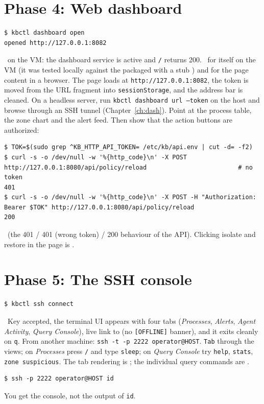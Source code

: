 \section{Phase 4: Web dashboard}
\resetsteps
{}
\begin{lstlisting}[style=console]
$ kbctl dashboard open
opened http://127.0.0.1:8082
\end{lstlisting}
\verified\ on the VM: the dashboard service is active and \texttt{/} returns 200. \notrun\ for  itself on the VM (it was tested locally against the packaged  with a stub ) and for the page content in a browser. The page loads at \texttt{http://127.0.0.1:8082},
the token is moved from the URL fragment into \texttt{sessionStorage}, and the address bar is cleaned. On a headless server, run
\texttt{kbctl dashboard url --token} on the host and browse through an SSH tunnel (Chapter~\ref{ch:dash}).
Point at the process table, the zone chart and the alert feed. Then show that the action buttons are authorized:
\begin{lstlisting}[style=console]
$ TOK=$(sudo grep ^KB_HTTP_API_TOKEN= /etc/kb/api.env | cut -d= -f2)
$ curl -s -o /dev/null -w '%{http_code}\n' -X POST http://127.0.0.1:8080/api/policy/reload                         # no token
401
$ curl -s -o /dev/null -w '%{http_code}\n' -X POST -H "Authorization: Bearer $TOK" http://127.0.0.1:8080/api/policy/reload
200
\end{lstlisting}
\verified\ (the 401 / 401 (wrong token) / 200 behaviour of the API). Clicking isolate and restore in the page is \notrun.

\section{Phase 5: The SSH console}
\resetsteps
{}
\begin{lstlisting}[style=console]
$ kbctl ssh connect
\end{lstlisting}
\verified\ Key accepted, the terminal UI appears with four tabs (\emph{Processes}, \emph{Alerts}, \emph{Agent Activity}, \emph{Query Console}), live link to 
(no \texttt{[OFFLINE]} banner), and it exits cleanly on \texttt{q}. From another machine: \texttt{ssh -t -p 2222 operator@HOST}.
\texttt{Tab} through the views; on \emph{Processes} press \texttt{/} and type \texttt{sleep}; on \emph{Query Console} try
\texttt{help}, \texttt{stats}, \texttt{zone suspicious}. The tab rendering is \verified; the individual query commands are \notrun.
\begin{lstlisting}[style=console]
$ ssh -p 2222 operator@HOST id
\end{lstlisting}
You get the console, not the output of \texttt{id}. \notrun

